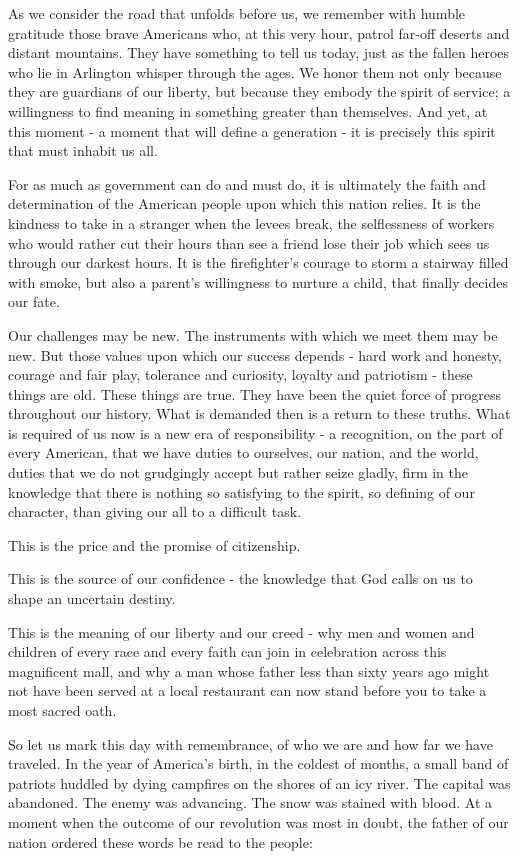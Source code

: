 \documentclass[12pt,a4paper,onecolumn]{article}
\begin{document}
\begin{sffamily}
As we consider the road that unfolds before us, we remember with humble gratitude those brave
Americans who, at this very hour, patrol far-off deserts and distant mountains. They have something
to tell us today, just as the fallen heroes who lie in Arlington whisper through the ages. We honor
them not only because they are guardians of our liberty, but because they embody the spirit of
service; a willingness to find meaning in something greater than themselves. And yet, at this moment
- a moment that will define a generation - it is precisely this spirit that must inhabit us all.

For as much as government can do and must do, it is ultimately the faith and determination of the
American people upon which this nation relies. It is the kindness to take in a stranger when the
levees break, the selflessness of workers who would rather cut their hours than see a friend lose
their job which sees us through our darkest hours. It is the firefighter's courage to storm a
stairway filled with smoke, but also a parent's willingness to nurture a child, that finally decides
our fate.

Our challenges may be new. The instruments with which we meet them may be new. But those values upon
which our success depends - hard work and honesty, courage and fair play, tolerance and curiosity,
loyalty and patriotism - these things are old. These things are true. They have been the quiet force
of progress throughout our history. What is demanded then is a return to these truths. What is
required of us now is a new era of responsibility - a recognition, on the part of every American,
that we have duties to ourselves, our nation, and the world, duties that we do not grudgingly accept
but rather seize gladly, firm in the knowledge that there is nothing so satisfying to the spirit, so
defining of our character, than giving our all to a difficult task.

This is the price and the promise of citizenship.

This is the source of our confidence - the knowledge that God calls on us to shape an uncertain
destiny.

This is the meaning of our liberty and our creed - why men and women and children of every race and
every faith can join in celebration across this magnificent mall, and why a man whose father less
than sixty years ago might not have been served at a local restaurant can now stand before you to
take a most sacred oath.

So let us mark this day with remembrance, of who we are and how far we have traveled. In the year of
America's birth, in the coldest of months, a small band of patriots huddled by dying campfires on
the shores of an icy river. The capital was abandoned. The enemy was advancing. The snow was stained
with blood. At a moment when the outcome of our revolution was most in doubt, the father of our
nation ordered these words be read to the people:


\end{sffamily}
\end{document}

